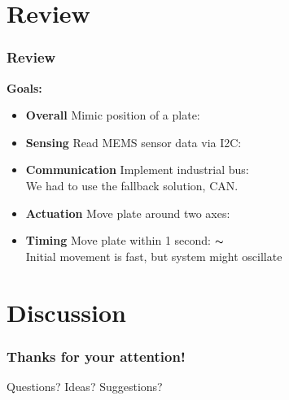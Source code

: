 \documentclass{beamer}
\begin{document}
\section{Review}
\begin{frame}
	\frametitle{Review}
	\textbf{Goals:}
	\begin{itemize}
		\item \textbf{Overall} Mimic position of a plate: \checkmark
		\vfill
		\item \textbf{Sensing} Read MEMS sensor data via I2C: \checkmark
		\item \textbf{Communication} Implement industrial bus: \checkmark \\
			We had to use the fallback solution, CAN.
		\item \textbf{Actuation} Move plate around two axes: \checkmark
		\item \textbf{Timing} Move plate within 1 second: $\thicksim$ \\
			Initial movement is fast, but system might oscillate
	\end{itemize}
\end{frame}

\section{Discussion}
\begin{frame}
  \frametitle{Thanks for your attention!}
  \huge{Questions? Ideas? Suggestions?}
\end{frame}
\end{document}
